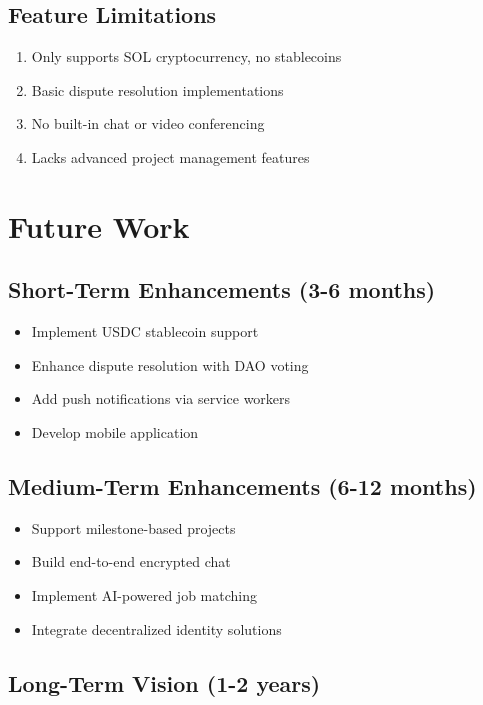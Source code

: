 \documentclass[a4paper,13pt,twoside]{report}
\theoremstyle{definition}
\begin{document}
\subsection{Feature Limitations}

\begin{enumerate}
    \item Only supports SOL cryptocurrency, no stablecoins
    \item Basic dispute resolution implementations
    \item No built-in chat or video conferencing
    \item Lacks advanced project management features
\end{enumerate}

\section{Future Work}

\subsection{Short-Term Enhancements (3-6 months)}

\begin{itemize}
    \item Implement USDC stablecoin support
    \item Enhance dispute resolution with DAO voting
    \item Add push notifications via service workers
    \item Develop mobile application
\end{itemize}

\subsection{Medium-Term Enhancements (6-12 months)}

\begin{itemize}
    \item Support milestone-based projects
    \item Build end-to-end encrypted chat
    \item Implement AI-powered job matching
    \item Integrate decentralized identity solutions
\end{itemize}

\subsection{Long-Term Vision (1-2 years)}
\end{document}
